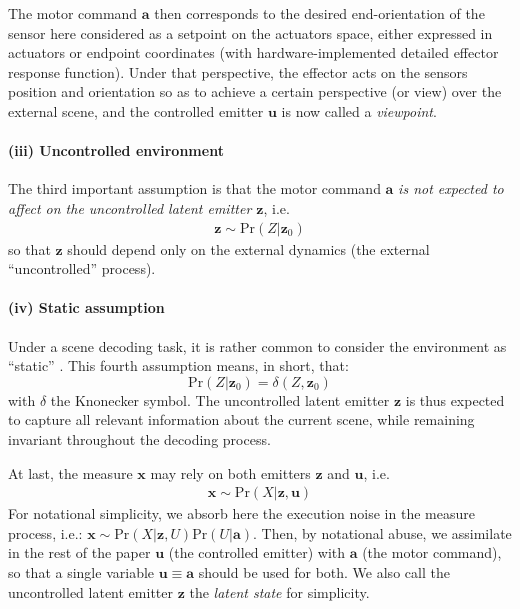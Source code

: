 \documentclass[12pt,twoside,openright]{article}
\begin{document}
The motor command $\boldsymbol{a}$ then corresponds to the desired end-orientation of the sensor here considered as a setpoint on the actuators space, either expressed in actuators or endpoint coordinates (with hardware-implemented detailed effector response function).  
Under that perspective, the effector acts on the sensors position and orientation so as to achieve a certain perspective (or view) over the external scene, and the controlled emitter $\boldsymbol{u}$ is now called a \emph{viewpoint}. 

\paragraph{(iii) Uncontrolled environment}
The third important assumption is that the motor command $\boldsymbol{a}$ \emph{is not expected to affect on the uncontrolled latent emitter $\boldsymbol{z}$}, i.e.
\begin{align*}
\boldsymbol{z} \sim \text{Pr}(Z|\boldsymbol{z}_0)
\end{align*}
so that $\boldsymbol{z}$ should depend only on the external dynamics (the external ``uncontrolled'' process).

\paragraph{(iv) Static assumption}
Under a scene decoding  task, %
it is rather common to consider the environment as ``static'' \cite{butko2010infomax}. This fourth assumption means, in short, that:
$$\text{Pr}(Z|\boldsymbol{z}_0) = \delta(Z, \boldsymbol{z}_0)$$ 
with $\delta$ the Knonecker symbol. 
The uncontrolled latent emitter $\boldsymbol{z}$ is thus expected to capture all relevant information about the current scene, while remaining invariant throughout the decoding process.


At last, the measure $\boldsymbol{x}$ may rely on both emitters $\boldsymbol{z}$ and $\boldsymbol{u}$, i.e. 
\begin{align}
\boldsymbol{x} \sim \text{Pr}(X|\boldsymbol{z}, \boldsymbol{u})
\end{align} 
For notational simplicity, we absorb here the execution noise \cite{van2004role} in the measure process, i.e.:
$\boldsymbol{x} \sim \text{Pr}(X|\boldsymbol{z}, U)\text{Pr}(U|\boldsymbol{a})$.
Then, by notational abuse, we assimilate in the rest of the paper  $\boldsymbol{u}$ (the controlled emitter) with $\boldsymbol{a}$ (the motor command), so that 
a single variable $\boldsymbol{u} \equiv \boldsymbol{a}$ should be used for both. We also call the uncontrolled latent emitter $\boldsymbol{z}$ the \emph{latent state} for simplicity.
\end{document}
